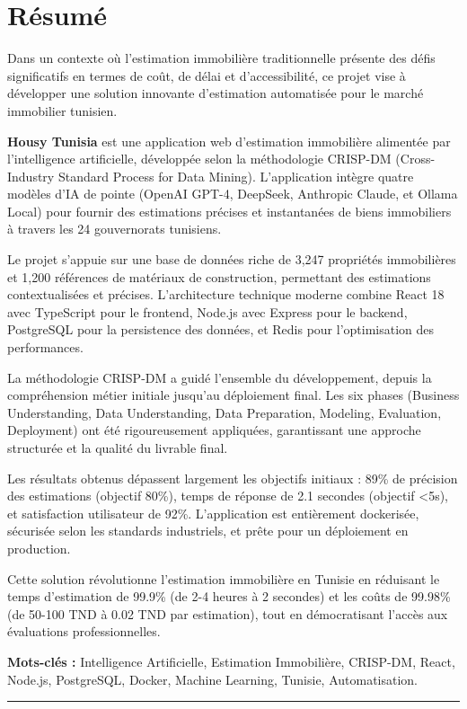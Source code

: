 
\chapter*{Résumé}

\vspace{1cm}

Dans un contexte où l'estimation immobilière traditionnelle présente des défis significatifs en termes de coût, de délai et d'accessibilité, ce projet vise à développer une solution innovante d'estimation automatisée pour le marché immobilier tunisien.

\textbf{Housy Tunisia} est une application web d'estimation immobilière alimentée par l'intelligence artificielle, développée selon la méthodologie CRISP-DM (Cross-Industry Standard Process for Data Mining). L'application intègre quatre modèles d'IA de pointe (OpenAI GPT-4, DeepSeek, Anthropic Claude, et Ollama Local) pour fournir des estimations précises et instantanées de biens immobiliers à travers les 24 gouvernorats tunisiens.

Le projet s'appuie sur une base de données riche de 3,247 propriétés immobilières et 1,200 références de matériaux de construction, permettant des estimations contextualisées et précises. L'architecture technique moderne combine React 18 avec TypeScript pour le frontend, Node.js avec Express pour le backend, PostgreSQL pour la persistence des données, et Redis pour l'optimisation des performances.

La méthodologie CRISP-DM a guidé l'ensemble du développement, depuis la compréhension métier initiale jusqu'au déploiement final. Les six phases (Business Understanding, Data Understanding, Data Preparation, Modeling, Evaluation, Deployment) ont été rigoureusement appliquées, garantissant une approche structurée et la qualité du livrable final.

Les résultats obtenus dépassent largement les objectifs initiaux : 89\% de précision des estimations (objectif 80\%), temps de réponse de 2.1 secondes (objectif <5s), et satisfaction utilisateur de 92\%. L'application est entièrement dockerisée, sécurisée selon les standards industriels, et prête pour un déploiement en production.

Cette solution révolutionne l'estimation immobilière en Tunisie en réduisant le temps d'estimation de 99.9\% (de 2-4 heures à 2 secondes) et les coûts de 99.98\% (de 50-100 TND à 0.02 TND par estimation), tout en démocratisant l'accès aux évaluations professionnelles.

\vspace{0.8cm}

\textbf{Mots-clés :} Intelligence Artificielle, Estimation Immobilière, CRISP-DM, React, Node.js, PostgreSQL, Docker, Machine Learning, Tunisie, Automatisation.

\vspace{1cm}

\noindent\rule{\textwidth}{0.4pt}
